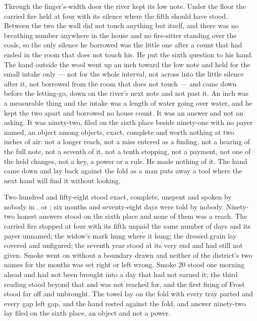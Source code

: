Through the finger's-width door the river kept its low note. Under the floor the carried fire held at four with its silence where the fifth should have stood. Between the two the wall did not touch anything but itself, and there was no breathing number anywhere in the house and no fire-sitter standing over the coals, so the only silence he borrowed was the little one after a count that had ended in the room that does not touch his. He put the sixth question to his hand. The hand outside the wool went up an inch toward the low note and held for the small intake only --- not for the whole interval, not across into the little silence after it, not borrowed from the room that does not touch --- and came down before the letting-go, down on the river's next note and not past it. An inch was a measurable thing and the intake was a length of water going over water, and he kept the two apart and borrowed no house count. It was an answer and not an asking. It was ninety-two, filed on the sixth place beside ninety-one with no payer named, an object among objects, exact, complete and worth nothing at two inches of air: not a longer reach, not a miss entered as a finding, not a hearing of the full note, not a seventh of it, not a tenth stopping, not a payment, not one of the held changes, not a key, a power or a rule. He made nothing of it. The hand came down and lay back against the fold as a man puts away a tool where the next hand will find it without looking.

Two hundred and fifty-eight stood exact, complete, unspent and spoken by nobody in ,  or ; six months and seventy-eight days were told by nobody. Ninety-two honest answers stood on the sixth place and none of them was a reach. The carried fire stopped at four with its fifth unpaid the same number of days and its payer unnamed; the widow's mark hung where it hung; the dressed grain lay covered and unfigured; the seventh year stood at its very end and had still not given. Smoke went on without a boundary drawn and neither of the district's two names for the months was set right or left wrong. Smoke 20 stood one morning ahead and had not been brought into a day that had not earned it; the third reading stood beyond that and was not reached for, and the first firing of Frost stood far off and unbrought. The towel lay on the fold with every tray parted and every gap left gap, and the hand rested against the fold, and answer ninety-two lay filed on the sixth place, an object and not a power.
